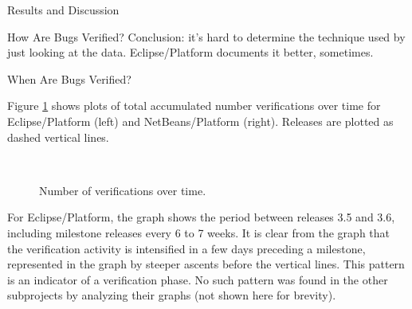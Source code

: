 \begin{section}{Results and Discussion}
\begin{subsection}{How Are Bugs Verified?}
	Conclusion: it's hard to determine the technique used by just looking at the data. Eclipse/Platform documents it better, sometimes.
	
\end{subsection}

\begin{subsection}{When Are Bugs Verified?}
	

	Figure \ref{fig:when} shows plots of total accumulated number verifications over time for Eclipse/Platform (left) and NetBeans/Platform (right). Releases are plotted as dashed vertical lines.	

\begin{figure}
\centering
\mbox{
{}}
\caption{Number of verifications over time.} \label{fig:when}
\end{figure}


	For Eclipse/Platform, the graph shows the period between releases 3.5 and 3.6, including milestone releases every 6 to 7 weeks. It is clear from the graph that the verification activity is intensified in a few days preceding a milestone, represented in the graph by steeper ascents before the vertical lines. This pattern is an indicator of a verification phase. No such pattern was found in the other subprojects by analyzing their graphs (not shown here for brevity).


\end{subsection}
\end{section}
